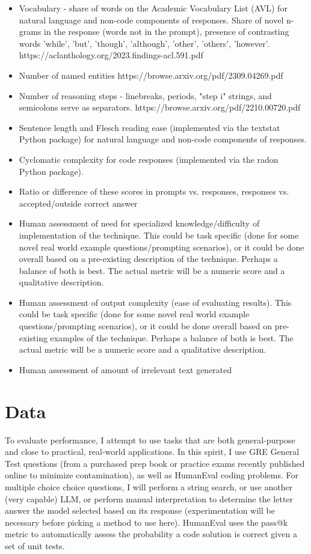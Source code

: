 \documentclass[11pt]{article}
\begin{document}
\begin{itemize}
  \item Vocabulary - share of words on the Academic Vocabulary List (AVL) for natural language and non-code components of responses. \cite{gardner_new_2014} Share of novel n-grams in the response (words not in the prompt), presence of contrasting words {'while', 'but', 'though', 'although', 'other', 'others', 'however'}. https://aclanthology.org/2023.findings-acl.591.pdf
  \item Number of named entities https://browse.arxiv.org/pdf/2309.04269.pdf
  \item Number of reasoning steps - linebreaks, periods, "step i" strings, and semicolons serve as separators. https://browse.arxiv.org/pdf/2210.00720.pdf
  \item Sentence length and Flesch reading ease (implemented via the textstat Python package) for natural language and non-code components of responses. \cite{flesch_how_2016, aggarwal_textstat_nodate}
  \item Cyclomatic complexity for code responses (implemented via the radon Python package). \cite{lacchia_radon_nodate}
  \item Ratio or difference of these scores in prompts vs. responses, responses vs. accepted/outside correct answer
  \item Human assessment of need for specialized knowledge/difficulty of implementation of the technique. This could be task specific (done for some novel real world example questions/prompting scenarios), or it could be done overall based on a pre-existing description of the technique. Perhaps a balance of both is best. The actual metric will be a numeric score and a qualitative description.
  \item Human assessment of output complexity (ease of evaluating results). This could be task specific (done for some novel real world example questions/prompting scenarios), or it could be done overall based on pre-existing examples of the technique. Perhaps a balance of both is best. The actual metric will be a numeric score and a qualitative description.
  \item Human assessment of amount of irrelevant text generated
\end{itemize}

\section*{Data}

To evaluate performance, I attempt to use tasks that are both general-purpose and close to practical, real-world applications. In this spirit, I use GRE General Test questions (from a purchased prep book or practice exams recently published online to minimize contamination), as well as HumanEval coding problems. For multiple choice choice questions, I will perform a string search, or use another (very capable) LLM, or perform manual interpretation to determine the letter answer the model selected based on its response (experimentation will be necessary before picking a method to use here). HumanEval uses the pass@k metric to automatically assess the probability a code solution is correct given a set of unit tests. \cite{chen_evaluating_2021}
\end{document}
